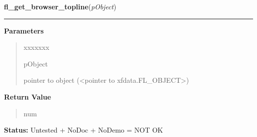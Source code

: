\hspace{.8\funcindent}\begin{boxedminipage}{\funcwidth}

    \raggedright \textbf{fl\_get\_browser\_topline}(\textit{pObject})

    \vspace{-1.5ex}

    \rule{\textwidth}{0.5\fboxrule}
\setlength{\parskip}{2ex}
\setlength{\parskip}{1ex}
      \textbf{Parameters}
      \vspace{-1ex}

      \begin{quote}
        \begin{Ventry}{xxxxxxx}

          \item[pObject]

          pointer to object ({\textless}pointer to 
          xfdata.FL\_OBJECT{\textgreater})

        \end{Ventry}

      \end{quote}

      \textbf{Return Value}
    \vspace{-1ex}

      \begin{quote}
      num

      \end{quote}

\textbf{Status:} Untested + NoDoc + NoDemo = NOT OK



    \end{boxedminipage}

    \label{xformslib:library:fl_get_browser}

    \vspace{0.5ex}

